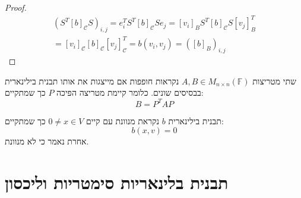 \documentclass{tstextbook}
\begin{document}
\begin{proof}
\begin{gather*}{{\left(S^{T}[b]_{\mathcal{C}}S\right)_{i,j}=e_{i}^{T}S^{T}[b]_{\mathcal{C}}S e_{j}}} {{=[v_{i}]_{B}S^{T}[b]_{\mathcal{C}}S[v_{j}]_{B}^{T}}}\\ {{=[v_{i}]_{\mathcal{C}}[b]_{\mathcal{C}}[v_{j}]_{\mathcal{C}}^{T}}} {{=b(v_{i},v_{j})=([b]_{B})_{i,j}}}\end{gather*}

\end{proof}
\begin{definition}
שתי מטריצות \(A, B \in M_{n\times n}\left( \mathbb{F}  \right)\) נקראות חופפות אם מייצגות את אותו תבנית בילינארית בבסיסים שונים. כלומר קיימת מטריצה הפיכה \(P\) כך שמתקיים:
$$B=P^{T}AP$$

\end{definition}
\begin{definition}
תבנית בילינארית \(b\) נקראת מנוונת עם קיים \(0\neq x \in V\) כך שמתקיים:
$$b(x,v)=0$$
אחרת נאמר כי לא מנוונת.

\end{definition}
\section{תבנית בלינאריות סימטריות וליכסון}
\end{document}
